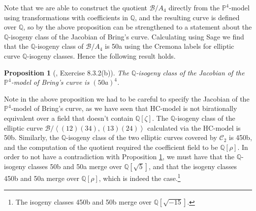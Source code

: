 \documentclass{amsart}
\newtheorem{prop}[theorem]{Proposition}
\newcommand{\pangle}[1]{\left\langle #1 \right\rangle}
\begin{document}
Note that we are able to construct the quotient $\mathcal{B}/A_4$ directly from the $\mathbb{P}^4$-model using transformations with coefficients in $\mathbb{Q}$, and the resulting curve is defined over $\mathbb{Q}$, so by \cite[Remark 6]{Kani1989} the above proposition can be strengthened to a statement about the $\mathbb{Q}$-isogeny class of the Jacobian of Bring's curve. Calculating using Sage we find that the $\mathbb{Q}$-isogeny class of $\mathcal{B}/A_4$ is 50a using the Cremona labels for elliptic curve $\mathbb{Q}$-isogeny classes. Hence the following result holds. 

\begin{prop}[\cite{Serre2008}, Exercise 8.3.2(b)]\label{prop: JB Q-isogeny class}
The $\mathbb{Q}$-isogeny class of the Jacobian of the $\mathbb{P}^4$-model of Bring's curve is $(50a)^4$. 
\end{prop}
Note in the above proposition we had to be careful to specify the Jacobian of the $\mathbb{P}^4$-model of Bring's curve, as we have seen that HC-model is not birationally equivalent over a field that doesn't contain $\mathbb{Q}[\zeta]$. The $\mathbb{Q}$-isogeny class of the elliptic curve $\mathcal{B}/\pangle{(12)(34), (13)(24)}$ calculated via the HC-model is 50b. Similarly, the $\mathbb{Q}$-isogeny class of the two elliptic curves covered by $\mathcal{C}_2$ is 450b, and the computation of the quotient required the coefficient field to be $\mathbb{Q}[\rho]$. In order to not have a contradiction with Proposition \ref{prop: JB Q-isogeny class}, we must have that the $\mathbb{Q}$-isogeny classes 50b and 50a merge over $\mathbb{Q}[\sqrt{5}]$, and that the isogeny classes 450b and 50a merge over $\mathbb{Q}[\rho]$, which is indeed the case.\footnote{The isogeny classes 450b and 50b merge over $\mathbb{Q}[\sqrt{-15}]$.}
\end{document}
